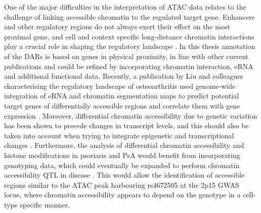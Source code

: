 One of the major difficulties in the interpretation of ATAC data relates to the challenge of linking accessible chromatin to the regulated target gene. Enhancers and other regulatory regions do not always exert their effect on the most proximal gene, and cell and context specific long-distance chromatin interactions play a crucial role in shaping the regulatory landscape \parencite{Smemo2014}. In this thesis annotation of the DARs is based on genes in physical proximity, in line with other current publications \parencite{Qu2015,Scharer2016,Wang2018} and could be refined by incorporating chromatin interaction, eRNA and additional functional data. %
Recently, a publication by Liu and colleagues characterising the regulatory landscape of osteoarthritis used genome-wide integration of eRNA and chromatin segmentation maps to predict potential target genes of differentially accessible regions and correlate them with gene expression \parencite{Cao2017,Liu2018}.  Moreover, differential chromatin accessibility due to genetic variation has been shown to precede changes in transcript levels, and this should also be taken into account when trying to integrate epigenetic and transcriptional changes \parencite{Alasoo2018,Calderon2018}. Furthermore, the analysis of differential chromatin accessibility and histone modifications in psoriasis and PsA would benefit from incorporating genotyping data, which could eventually be expanded to perform chromatin accessibility QTL in disease \parencite{Mo2018,Alasoo2018}. This would allow the identification of accessible regions similar to the ATAC peak harbouring rs4672505 at the 2p15 GWAS locus, where chromatin accessibility appears to depend on the genotype in a cell-type specific manner. %

